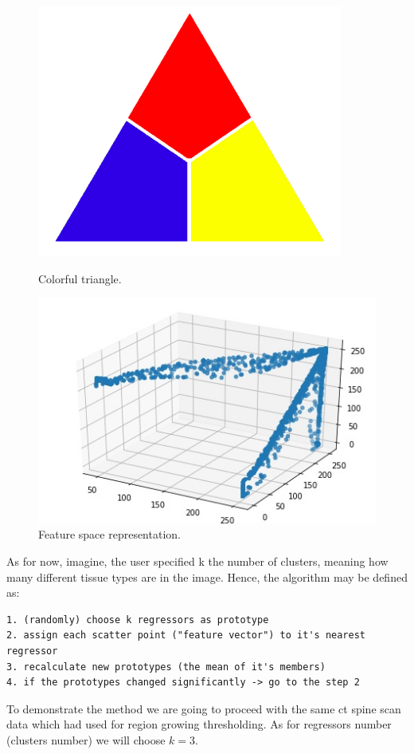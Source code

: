 \begin{figure}[h]
    \centering
    \begin{minipage}[b]{0.4\textwidth}
    \includegraphics[width=\textwidth]{images/k_mean_triangle.png}
    \caption{Colorful triangle.}
    \end{minipage}
    \hfill
    \begin{minipage}[b]{0.4\textwidth}
    \includegraphics[width=\textwidth]{images/k_mean_triangle_clustered.jpg}
    \caption{Feature space representation.}
    \end{minipage}
\end{figure}


As for now, imagine, the user specified k the number of clusters, meaning how many different tissue types are in the image.
Hence, the algorithm may be defined as:
\begin{lstlisting}
1. (randomly) choose k regressors as prototype
2. assign each scatter point ("feature vector") to it's nearest regressor
3. recalculate new prototypes (the mean of it's members)
4. if the prototypes changed significantly -> go to the step 2 
\end{lstlisting}
To demonstrate the method we are going to proceed with the same ct spine scan data which had used for region growing thresholding. As for regressors number (clusters number) we will choose $k=3$.  

